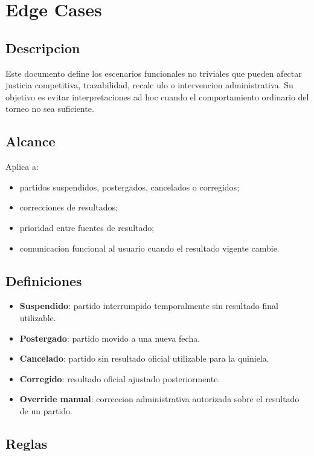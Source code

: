 \section{Edge Cases}

\subsection{Descripcion}

Este documento define los escenarios funcionales no triviales que pueden afectar justicia competitiva, trazabilidad, recalc ulo o intervencion administrativa. Su objetivo es evitar interpretaciones ad hoc cuando el comportamiento ordinario del torneo no sea suficiente.

\subsection{Alcance}

Aplica a:

\begin{itemize}
  \item partidos suspendidos, postergados, cancelados o corregidos;
  \item correcciones de resultados;
  \item prioridad entre fuentes de resultado;
  \item comunicacion funcional al usuario cuando el resultado vigente cambie.
\end{itemize}

\subsection{Definiciones}

\begin{itemize}
  \item \textbf{Suspendido}: partido interrumpido temporalmente sin resultado final utilizable.
  \item \textbf{Postergado}: partido movido a una nueva fecha.
  \item \textbf{Cancelado}: partido sin resultado oficial utilizable para la quiniela.
  \item \textbf{Corregido}: resultado oficial ajustado posteriormente.
  \item \textbf{Override manual}: correccion administrativa autorizada sobre el resultado de un partido.
\end{itemize}

\subsection{Reglas}

